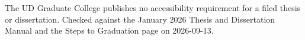 %
\thesissetchapteropening{2in}

%

%
	{The UD Graduate College publishes no accessibility requirement for a filed
	 thesis or dissertation. Checked against the January 2026 Thesis and
	 Dissertation Manual and the Steps to Graduation page on 2026-09-13.}

